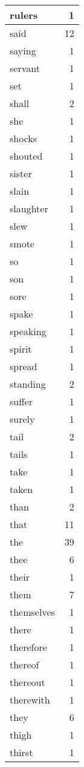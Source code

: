 \begin{center}
\begin{longtable}{l|r}
rulers & 1\\ \hline 
said & 12\\ \hline 
saying & 1\\ \hline 
servant & 1\\ \hline 
set & 1\\ \hline 
shall & 2\\ \hline 
she & 1\\ \hline 
shocks & 1\\ \hline 
shouted & 1\\ \hline 
sister & 1\\ \hline 
slain & 1\\ \hline 
slaughter & 1\\ \hline 
slew & 1\\ \hline 
smote & 1\\ \hline 
so & 1\\ \hline 
son & 1\\ \hline 
sore & 1\\ \hline 
spake & 1\\ \hline 
speaking & 1\\ \hline 
spirit & 1\\ \hline 
spread & 1\\ \hline 
standing & 2\\ \hline 
suffer & 1\\ \hline 
surely & 1\\ \hline 
tail & 2\\ \hline 
tails & 1\\ \hline 
take & 1\\ \hline 
taken & 1\\ \hline 
than & 2\\ \hline 
that & 11\\ \hline 
the & 39\\ \hline 
thee & 6\\ \hline 
their & 1\\ \hline 
them & 7\\ \hline 
themselves & 1\\ \hline 
there & 1\\ \hline 
therefore & 1\\ \hline 
thereof & 1\\ \hline 
thereout & 1\\ \hline 
therewith & 1\\ \hline 
they & 6\\ \hline 
thigh & 1\\ \hline 
thirst & 1\\ \hline 

\end{longtable}
\end{center}
